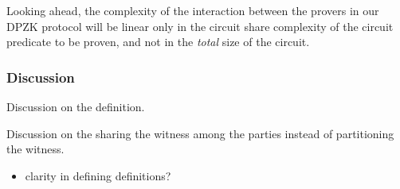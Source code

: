 Looking ahead, the complexity of the interaction between the provers in our DPZK protocol will be linear only in the circuit share complexity of the circuit predicate to be proven, and not in the \textit{total} size of the circuit. 
 
\subsubsection{Discussion}
Discussion on the definition.

Discussion on the sharing the witness among the parties instead of partitioning the witness.
\begin{itemize}
\item clarity in defining definitions?
\end{itemize}

%
%
